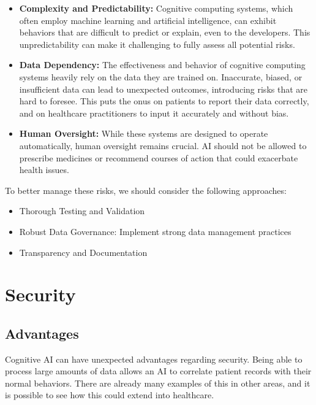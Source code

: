 \documentclass{article}
\begin{document}
\begin{itemize}
	\item \textbf{Complexity and Predictability:} Cognitive computing systems, which often employ machine learning and artificial intelligence, can exhibit behaviors that are difficult to predict or explain, even to the developers. This unpredictability can make it challenging to fully assess all potential risks.
	\item \textbf{Data Dependency:} The effectiveness and behavior of cognitive computing systems heavily rely on the data they are trained on. Inaccurate, biased, or insufficient data can lead to unexpected outcomes, introducing risks that are hard to foresee. This puts the onus on patients to report their data correctly, and on healthcare practitioners to input it accurately and without bias.
	\item \textbf{Human Oversight:} While these systems are designed to operate automatically, human oversight remains crucial. AI should not be allowed to prescribe medicines or recommend courses of action that could exacerbate health issues.
\end{itemize}

To better manage these risks, we should consider the following approaches:
\begin{itemize}
	\item Thorough Testing and Validation
	\item Robust Data Governance: Implement strong data management practices
	\item Transparency and Documentation
\end{itemize}

\section{Security}
\subsection{Advantages}
Cognitive AI can have unexpected advantages regarding security. Being able to process large amounts of data allows an AI to correlate patient records with their normal behaviors. There are already many examples of this \cite{security} in other areas, and it is possible to see how this could extend into healthcare.
\end{document}

